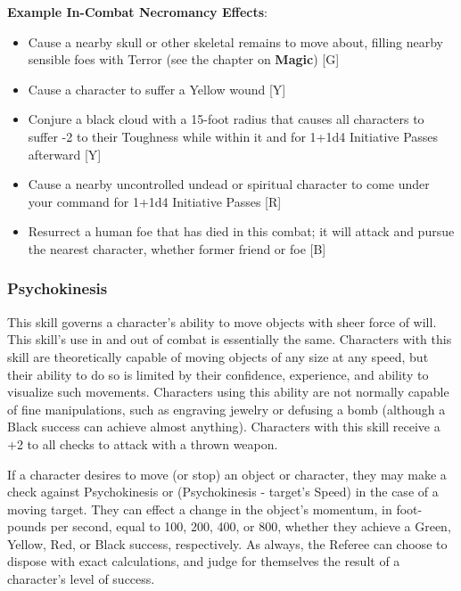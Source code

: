 \documentclass[oneside]{book}
\begin{document}
\begin{multicols}{2}
\textbf{Example In-Combat Necromancy Effects}:
	\begin{itemize}
		\setlength{\itemsep}{0cm}%
  		\setlength{\parskip}{0cm}%
		\item{ \small Cause a nearby skull or other skeletal remains to move about, filling nearby sensible foes with Terror (see the chapter on \textbf{Magic})  [G]}
		\item{ \small Cause a character to suffer a Yellow wound  [Y]}
		\item{ \small Conjure a black cloud with a 15-foot radius that causes all characters to suffer -2 to their Toughness while within it and for 1+1d4 Initiative Passes afterward [Y]}
		\item{ \small Cause a nearby uncontrolled undead or spiritual character to come under your command for 1+1d4 Initiative Passes [R]}
		\item{ \small Resurrect a human foe that has died in this combat; it will attack and pursue the nearest character, whether former friend or foe [B]}
	\end{itemize}
 
\subsubsection{Psychokinesis}
This skill governs a character's ability to move objects with sheer force of will. This skill's use in and out of combat is essentially the same. Characters with this skill are theoretically capable of moving objects of any size at any speed, but their ability to do so is limited by their confidence, experience, and ability to visualize such movements. Characters using this ability are not normally capable of fine manipulations, such as engraving jewelry or defusing a bomb (although a Black success can achieve almost anything). Characters with this skill receive a +2 to all checks to attack with a thrown weapon. 

If a character desires to move (or stop) an object or character, they may make a check against Psychokinesis or (Psychokinesis - target's Speed) in the case of a moving target. They can effect a change in the object's momentum, in foot-pounds per second, equal to 100, 200, 400, or 800, whether they achieve a Green, Yellow, Red, or Black success, respectively. As always, the Referee can choose to dispose with exact calculations, and judge for themselves the result of a character's level of success.


\end{multicols}
\end{document}
